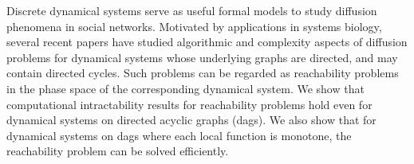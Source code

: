 Discrete dynamical systems serve as 
useful formal models to study diffusion phenomena in social networks.
Motivated by applications in systems biology,
several recent papers have studied algorithmic and complexity aspects of
diffusion problems for dynamical systems whose underlying graphs
are directed, and may contain directed cycles.  
Such problems can be regarded as
reachability problems in the phase space of the corresponding
dynamical system. We show that computational intractability
results for reachability problems hold even for dynamical systems
on directed acyclic graphs (dags). 
We also show that for dynamical systems on dags
where each local function is monotone, 
the reachability problem can be solved efficiently. 
